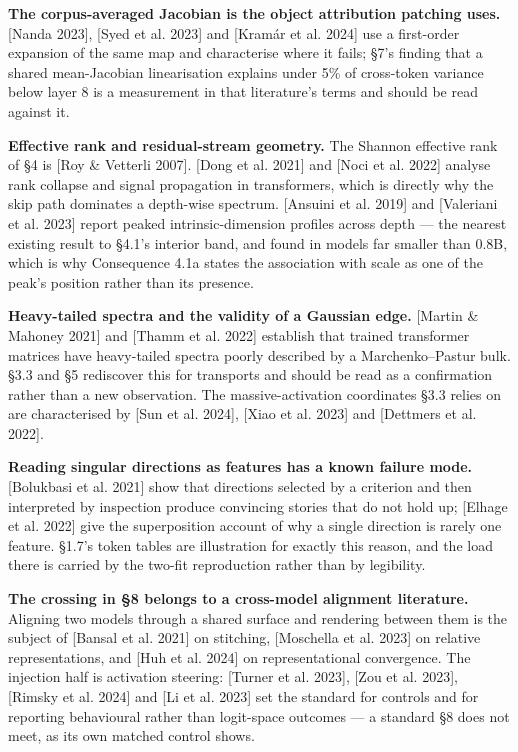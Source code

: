 \documentclass[10pt,letterpaper,twocolumn]{article}
\begin{document}
\textbf{The corpus-averaged Jacobian is the object attribution patching uses.} {[}Nanda 2023{]},
{[}Syed et al. 2023{]} and {[}Kramár et al. 2024{]} use a first-order expansion of the same map and
characterise where it fails; §7's finding that a shared mean-Jacobian linearisation explains under
5\% of cross-token variance below layer 8 is a measurement in that literature's terms and should be
read against it.

\textbf{Effective rank and residual-stream geometry.} The Shannon effective rank of §4 is {[}Roy \&
Vetterli 2007{]}. {[}Dong et al. 2021{]} and {[}Noci et al. 2022{]} analyse rank collapse and signal
propagation in transformers, which is directly why the skip path dominates a depth-wise spectrum.
{[}Ansuini et al. 2019{]} and {[}Valeriani et al. 2023{]} report peaked intrinsic-dimension profiles across
depth --- the nearest existing result to §4.1's interior band, and found in models far smaller than
0.8B, which is why Consequence 4.1a states the association with scale as one of the peak's position rather than its presence.

\textbf{Heavy-tailed spectra and the validity of a Gaussian edge.} {[}Martin \& Mahoney 2021{]} and
{[}Thamm et al. 2022{]} establish that trained transformer matrices have heavy-tailed spectra poorly
described by a Marchenko--Pastur bulk. §3.3 and §5 rediscover this for transports and should be read
as a confirmation rather than a new observation. The massive-activation coordinates §3.3 relies on
are characterised by {[}Sun et al. 2024{]}, {[}Xiao et al. 2023{]} and {[}Dettmers et al. 2022{]}.

\textbf{Reading singular directions as features has a known failure mode.} {[}Bolukbasi et al. 2021{]} show
that directions selected by a criterion and then interpreted by inspection produce convincing
stories that do not hold up; {[}Elhage et al. 2022{]} give the superposition account of why a single
direction is rarely one feature. §1.7's token tables are illustration for exactly this reason, and
the load there is carried by the two-fit reproduction rather than by legibility.

\textbf{The crossing in §8 belongs to a cross-model alignment literature.} Aligning two models through a
shared surface and rendering between them is the subject of {[}Bansal et al. 2021{]} on stitching,
{[}Moschella et al. 2023{]} on relative representations, and {[}Huh et al. 2024{]} on representational
convergence. The injection half is activation steering: {[}Turner et al. 2023{]}, {[}Zou et al. 2023{]},
{[}Rimsky et al. 2024{]} and {[}Li et al. 2023{]} set the standard for controls and for reporting
behavioural rather than logit-space outcomes --- a standard §8 does not meet, as its own matched
control shows.
\end{document}
